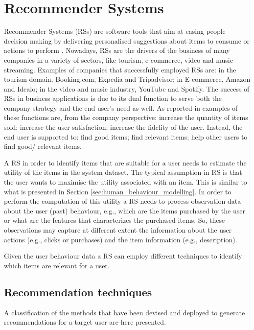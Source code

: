 \section{Recommender Systems}
\label{sec:recommender_system}
Recommender Systems (RSs) are software tools that aim at easing people 
decision making by delivering personalised suggestions about items to 
consume or actions to perform \cite{RSdef:2015}. 
Nowadays, RSs are the drivers of 
the business of many companies in a variety of sectors, like tourism, e-commerce, video and music streaming. Examples of companies that successfully employed RSs are: in the tourism domain, Booking.com, Expedia and Tripadvisor; in E-commerce, Amazon and Idealo; in the video and music industry, YouTube and Spotify.
The success of RSs in business applications is due to its dual function to serve both the company strategy and the end user's need as well. As reported in \cite{RSdef:2015} examples of these functions are, from the company perspective: increase the quantity of items sold; increase the user satisfaction; increase the fidelity of the user. Instead, the end user is supported to: find good items; find relevant items; help other users to find good/ relevant items.  

A RS in order to identify items that are suitable for a user needs to estimate the utility of the items in the system dataset. The typical assumption in RS is that the user wants to maximise the utility associated with an item. This is similar to what is presented in Section \ref{sec:human_behaviour_modelling}. In order to perform the computation of this utility a RS needs to process observation data about the user (past) behaviour, e.g., which are the items purchased by the user or what are the features that characterizes the purchased items. So, these observations may capture at different extent the information about the user actions (e.g., clicks or purchases) and the item information (e.g., description).

Given the user behaviour data a RS can employ different techniques to identify which items are relevant for a user.

\subsection{Recommendation techniques}
A classification of the methods that have been devised and deployed to generate recommendations for a target user are here presented. \newline

